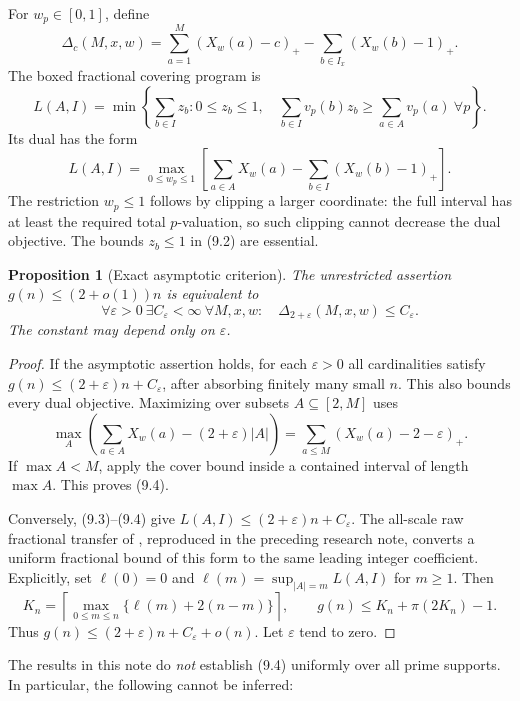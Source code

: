 \documentclass[11pt,a4paper]{article}
\newtheorem{proposition}[theorem]{Proposition}
\theoremstyle{remark}
\newcommand{\pos}[1]{\left(#1\right)_+}
\begin{document}
For \(w_p\in[0,1]\), define
\[
 \Delta_c(M,x,w)=
 \sum_{a=1}^M\pos{X_w(a)-c}
 -
 \sum_{b\in I_x}\pos{X_w(b)-1}.
 \tag{9.1}
\]
The boxed fractional covering program is
\[
 L(A,I)=\min\left\{\sum_{b\in I}z_b:
 0\le z_b\le1,\quad
 \sum_{b\in I}v_p(b)z_b\ge\sum_{a\in A}v_p(a)\ \forall p\right\}.
 \tag{9.2}
\]
Its dual has the form
\[
 L(A,I)=\max_{0\le w_p\le1}
 \left[\sum_{a\in A}X_w(a)-
       \sum_{b\in I}\pos{X_w(b)-1}\right].
 \tag{9.3}
\]
The restriction \(w_p\le1\) follows by clipping a larger coordinate:
the full interval has at least the required total \(p\)-valuation,
so such clipping cannot decrease the dual objective. The bounds
\(z_b\le1\) in (9.2) are essential.

\begin{proposition}[Exact asymptotic criterion]
\label{prop:criterion}
The unrestricted assertion \(g(n)\le(2+o(1))n\) is equivalent to
\[
 \forall\varepsilon>0\ \exists C_\varepsilon<\infty\
 \forall M,x,w:\quad
 \Delta_{2+\varepsilon}(M,x,w)\le C_\varepsilon.
 \tag{9.4}
\]
The constant may depend only on \(\varepsilon\).
\end{proposition}
\begin{proof}
If the asymptotic assertion holds, for each \(\varepsilon>0\) all
cardinalities satisfy
\(g(n)\le(2+\varepsilon)n+C_\varepsilon\), after absorbing finitely
many small \(n\). This also bounds every dual objective.
Maximizing over subsets \(A\subseteq[2,M]\) uses
\[
 \max_A\left(\sum_{a\in A}X_w(a)-(2+\varepsilon)|A|\right)
 =\sum_{a\le M}\pos{X_w(a)-2-\varepsilon}.
 \]
If \(\max A<M\), apply the cover bound inside a contained interval of
length \(\max A\). This proves (9.4).

Conversely, (9.3)--(9.4) give
\(L(A,I)\le(2+\varepsilon)n+C_\varepsilon\).
The all-scale raw fractional transfer of \cite{Wang}, reproduced in
the preceding research note, converts a uniform fractional bound of
this form to the same leading integer coefficient. Explicitly, set
\(\ell(0)=0\) and \(\ell(m)=\sup_{|A|=m}L(A,I)\) for \(m\ge1\). Then
\[
 K_n=\left\lceil\max_{0\le m\le n}
              \{\ell(m)+2(n-m)\}\right\rceil,
 \qquad
 g(n)\le K_n+\pi(2K_n)-1.
 \]
Thus \(g(n)\le(2+\varepsilon)n+C_\varepsilon+o(n)\).
Let \(\varepsilon\) tend to zero.
\end{proof}

The results in this note do \emph{not} establish (9.4) uniformly over
all prime supports. In particular, the following cannot be inferred:
\end{document}
